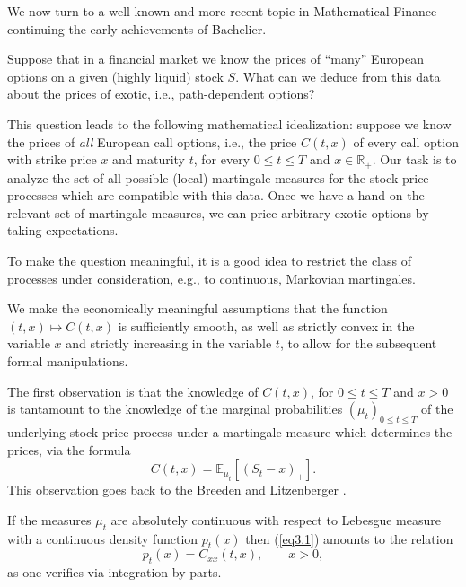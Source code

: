 \documentclass[11pt,a4paper]{article}%
\def\E{{\mathbb E}}
\def\R{{\mathbb R}}
\numberwithin{equation}{section}
\begin{document}
We now turn to a well-known and more recent topic in Mathematical Finance continuing the early achievements of Bachelier.

Suppose that in a financial market we know the prices of ``many'' European options on a given (highly liquid) stock $S$. What can we deduce from this data about the prices of exotic, i.e., path-dependent options?

This question leads to the following mathematical idealization: suppose we know the prices of \textit{all} European call options, i.e., the price $C(t,x)$ of every call option with strike price $x$ and maturity $t$, for every $0 \le t \le T$ and $x \in \R_+$. Our task is to analyze the set of all possible (local) martingale measures for the stock price processes which are compatible with this data.
Once we have a hand on the relevant set of martingale measures, we can price arbitrary exotic options by taking expectations.

To make the question meaningful, it is a good idea to restrict the class of processes under consideration, e.g., to continuous, Markovian martingales.

We make the economically meaningful assumptions that the function $(t,x) \mapsto C(t,x)$ is sufficiently smooth, as well as strictly convex in the variable $x$ and strictly increasing in the variable $t$, to allow for the subsequent formal manipulations. 


The first observation is that the knowledge of $C(t,x)$, for $0\le t\le T$ and $x>0$ is tantamount to the knowledge of the marginal probabilities $(\mu_t)_{0 \le t \le T}$ of the underlying stock price process under a martingale measure which determines the prices, via the formula 
\begin{equation} \label{eq3.1}
C(t,x) = \E_{\mu_t}[(S_t-x)_+].
\end{equation}
This observation goes back to the Breeden and Litzenberger \cite{BrLi78}.

If the measures $\mu_t$ are absolutely continuous with respect to Lebesgue measure with a continuous density function $p_t(x)$ then (\ref {eq3.1}) amounts to the relation
\begin{equation}\label{eq3.2}
p_t(x) = C_{xx}(t,x),\qquad x>0,
\end{equation}
as one verifies via integration by parts.
\end{document}
